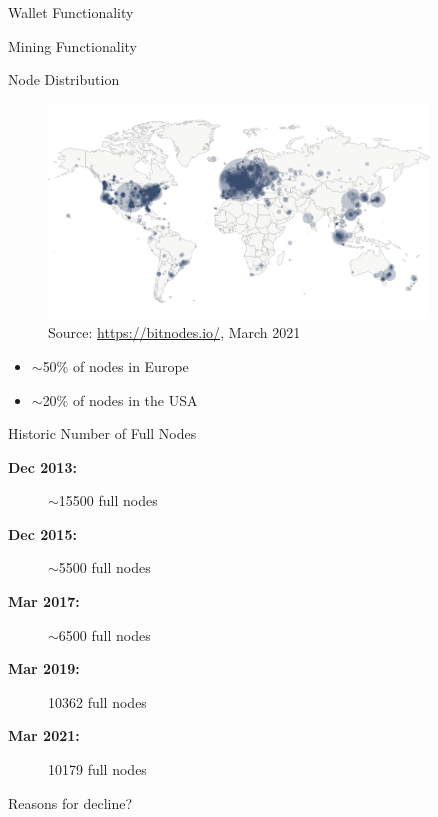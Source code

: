 \documentclass[handout]{beamer}
\begin{document}
\begin{frame}{Wallet Functionality}
	\centering
	\begin{tikzpicture}[scale=1, every node/.style={scale=1}]
		
	\end{tikzpicture}
\end{frame}

\begin{frame}{Mining Functionality}
	\centering
	\begin{tikzpicture}[scale=1, every node/.style={scale=1}]
		
	\end{tikzpicture}
\end{frame}

\begin{frame}{Node Distribution}
	\begin{figure}[t]
		\includegraphics[width = 0.9\textwidth]{../assets/images/node_distribution}
		Source: \link \url{https://bitnodes.io/}, March 2021
	\end{figure}

	\begin{footnotesize}
		\begin{itemize}
			\item $\sim$50\% of nodes in Europe
			\item $\sim$20\% of nodes in the USA
		\end{itemize}
	\end{footnotesize}
	
\end{frame}

\begin{frame}{Historic Number of Full Nodes}
	\begin{description}
		\item[\textbf{Dec 2013:}] $\sim$15500 full nodes
		\item[\textbf{Dec 2015:}] $\sim$5500 full nodes
		\item[\textbf{Mar 2017:}] $\sim$6500 full nodes
		\item[\textbf{Mar 2019:}] 10362 full nodes
		\item[\textbf{Mar 2021:}] 10179 full nodes
	\end{description}	
		
	\vspace{1.5 cm}
		
	Reasons for decline?
	
\end{frame}
\end{document}

